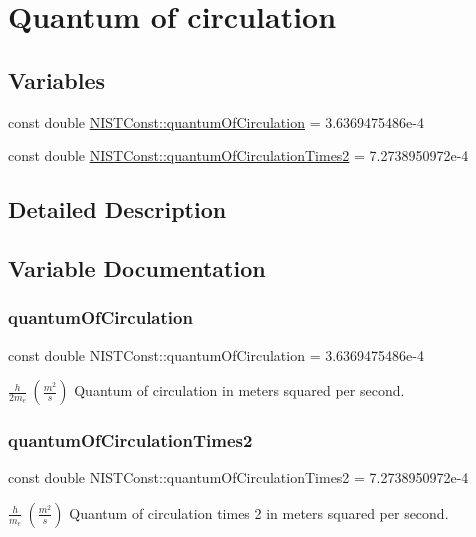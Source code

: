 \hypertarget{group___quantum_of_circulation}{}\section{Quantum of circulation}
\label{group___quantum_of_circulation}
\subsection*{Variables}
\begin{DoxyCompactItemize}
\item 
const double \hyperlink{group___quantum_of_circulation_ga7dbe55704b9a968adfc99d60f5d2dd11}{N\+I\+S\+T\+Const\+::quantum\+Of\+Circulation} = 3.\+6369475486e-\/4
\item 
const double \hyperlink{group___quantum_of_circulation_ga86d150a3f178c37f565f6498cf593dbe}{N\+I\+S\+T\+Const\+::quantum\+Of\+Circulation\+Times2} = 7.\+2738950972e-\/4
\end{DoxyCompactItemize}


\subsection{Detailed Description}


\subsection{Variable Documentation}
\mbox{\label{group___quantum_of_circulation_ga7dbe55704b9a968adfc99d60f5d2dd11}} 
\subsubsection{\texorpdfstring{quantum\+Of\+Circulation}{quantumOfCirculation}}
{\footnotesize\ttfamily const double N\+I\+S\+T\+Const\+::quantum\+Of\+Circulation = 3.\+6369475486e-\/4}

$\frac{h}{2 m_e} \ (\frac{m^2}{s})$ Quantum of circulation in meters squared per second. \mbox{\label{group___quantum_of_circulation_ga86d150a3f178c37f565f6498cf593dbe}} 
\subsubsection{\texorpdfstring{quantum\+Of\+Circulation\+Times2}{quantumOfCirculationTimes2}}
{\footnotesize\ttfamily const double N\+I\+S\+T\+Const\+::quantum\+Of\+Circulation\+Times2 = 7.\+2738950972e-\/4}

$\frac{h}{m_e} \ (\frac{m^2}{s})$ Quantum of circulation times 2 in meters squared per second. 